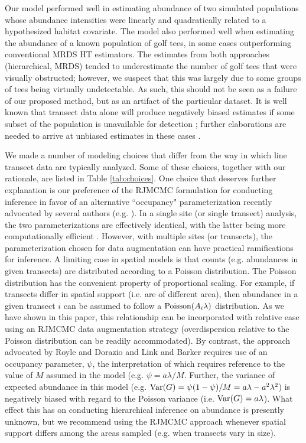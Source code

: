 \documentclass[10pt]{article}
\begin{document}
Our model performed well in estimating abundance of two simulated populations whose abundance intensities were linearly and quadratically related to a hypothesized habitat covariate.  The model also performed well when estimating the abundance of a known population of golf tees, in some cases outperforming conventional MRDS HT estimators.  The estimates from both approaches (hierarchical, MRDS) tended to underestimate the number of golf tees that were visually obstructed; however, we suspect that this was largely due to some groups of tees being virtually undetectable.  As such, this should not be seen as a failure of our proposed method, but as an artifact of the particular dataset.  It is well known that transect data alone will produce negatively biased estimates if some subset of the population is unavailable for detection \cite{McLaren1961}; further elaborations are needed to arrive at unbiased estimates in these cases \cite{Marsh1989,Bengtson2005,DiefenbachEtAl2007}.

We made a number of modeling choices that differ from the way in which line transect data are typically analyzed. Some of these choices, together with our rationale, are listed in Table \ref{tab:choices}.  One choice that deserves further explanation is our preference of the RJMCMC formulation for conducting inference in favor of an alternative ``occupancy" parameterization recently advocated by several authors (e.g. \cite{RoyleDorazio2008,LinkBarker2010}).  In a single site (or single transect) analysis, the two parameterizations are effectively identical, with the latter being more computationally efficient \cite{LinkBarker2010}.  However, with multiple sites (or transects), the parameterization chosen for data augmentation can have practical ramifications for inference.  A limiting case in spatial models is that counts (e.g. abundances in given transects) are distributed according to a Poisson distribution.  The Poisson distribution has the convenient property of proportional scaling.  For example, if transects differ in spatial support (i.e. are of different area), then abundance in a given transect $i$ can be assumed to follow a ${\rm Poisson}(A_i\lambda)$ distribution.  As we have shown in this paper, this relationship can be incorporated with relative ease using an RJMCMC data augmentation strategy (overdispersion relative to the Poisson distribution can be readily accommodated). By contrast, the approach advocated by Royle and Dorazio \cite{RoyleDorazio2008} and Link and Barker \cite{LinkBarker2010} requires use of an occupancy parameter, $\psi$, the interpretation of which requires reference to the value of $M$ assumed in the model (e.g. $\psi=a\lambda/M$.  Further, the variance of expected abundance in this model (e.g. ${\rm Var}(G)=\psi (1-\psi)/M = a\lambda-a^2\lambda^2$) is negatively biased with regard to the Poisson variance (i.e. ${\rm Var}(G)=a\lambda$).  What effect this has on conducting hierarchical inference on abundance is presently unknown, but we recommend using the RJMCMC approach whenever spatial support differs among the areas sampled (e.g. when transects vary in size).
\end{document}

